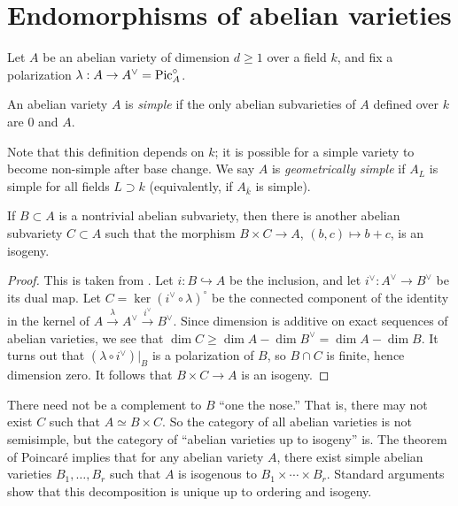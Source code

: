 \documentclass{article}
\begin{document}
\section{Endomorphisms of abelian varieties}

Let $A$ be an abelian variety of dimension $d\geqslant 1$ over a field $k$, 
and fix a polarization $\lambda:A\to A^\vee=\operatorname{Pic}_A^\circ$. 

\begin{definition}
An abelian variety $A$ is \emph{simple} if the only abelian subvarieties of $A$ 
defined over $k$ are $0$ and $A$.
\end{definition}

Note that this definition depends on $k$; it is possible for a simple variety 
to become non-simple after base change. We say $A$ is \emph{geometrically 
simple} if $A_L$ is simple for all fields $L\supset k$ (equivalently, if 
$A_{\bar k}$ is simple). 

\begin{theorem}[Poincar\'e]
If $B\subset A$ is a nontrivial abelian subvariety, then there is another 
abelian subvariety $C\subset A$ such that the morphism $B\times C\to A$, 
$(b,c)\mapsto b+c$, is an isogeny. 
\end{theorem}
\begin{proof}
This is taken from \cite[I.10.1]{mi}. Let $i:B\hookrightarrow A$ be the 
inclusion, and let $i^\vee:A^\vee \to B^\vee$ be its dual map. Let 
$C=\ker(i^\vee\circ\lambda)^\circ$ be the connected component of the identity 
in the kernel of $A\xrightarrow\lambda A^\vee \xrightarrow{i^\vee} B^\vee$. 
Since dimension is additive on exact sequences of abelian varieties, we see 
that $\dim C\geqslant \dim A-\dim B^\vee=\dim A-\dim B$. It turns out that 
$(\lambda\circ i^\vee)|_B$ is a polarization of $B$, so $B\cap C$ is finite, 
hence dimension zero. It follows that $B\times C\to A$ is an isogeny. 
\end{proof}

There need not be a complement to $B$ ``one the nose.'' That is, there may not 
exist $C$ such that $A\simeq B\times C$. So the category of all abelian 
varieties is not semisimple, but the category of ``abelian varieties up to 
isogeny'' is. The theorem of Poincar\'e implies that for any abelian variety 
$A$, there exist simple abelian varieties $B_1,\dots,B_r$ such that $A$ is 
isogenous to $B_1\times\cdots \times B_r$. Standard arguments show that this 
decomposition is unique up to ordering and isogeny. 
\end{document}
